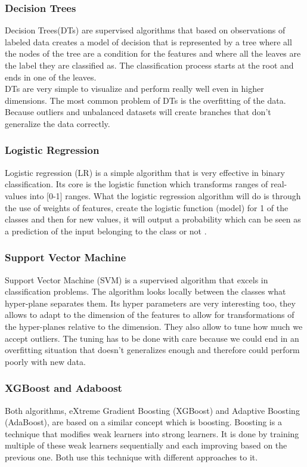 \subsubsection{Decision Trees}
Decision Trees(DTs) are supervised algorithms that based on observations of labeled data creates a model of decision that is represented by a tree where all the nodes of the tree are a condition for the features and where all the leaves are the label they are classified as. The classification process starts at the root and ends in one of the leaves.\\
DTs are very simple to visualize and perform really well even in higher dimensions. The most common problem of DTs is the overfitting of the data. Because outliers and unbalanced datasets will create branches that don't generalize the data correctly.

\subsubsection{Logistic Regression}
Logistic regression (LR) is a simple algorithm that is very effective in binary classification. Its core is the logistic function which transforms ranges of real-values into [0-1] ranges. What the logistic regression algorithm will do is through the use of weights of features, create the logistic function (model) for 1 of the classes and then for new values, it will output a probability which can be seen as a prediction of the input belonging to the class or not \cite{lr}.

\subsubsection{Support Vector Machine}
Support Vector Machine (SVM) is a supervised algorithm that excels in classification problems. The algorithm looks locally between the classes what hyper-plane separates them. 
Its hyper parameters are very interesting too, they allows to adapt to the dimension of the features to allow for transformations of the hyper-planes relative to the dimension. They also allow to tune how much we accept outliers. The tuning has to be done with care because we could end in an overfitting situation that doesn't generalizes enough and therefore could perform poorly with new data.

\subsubsection{XGBoost and Adaboost}
Both algorithms, eXtreme Gradient Boosting (XGBoost) and Adaptive Boosting (AdaBoost), are based on a similar concept which is boosting. Boosting is a technique that modifies weak learners into strong learners. It is done by training multiple of these weak learners sequentially and each improving based on the previous one.\cite{boosting} Both use this technique with different approaches to it.

